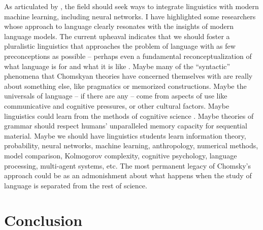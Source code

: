 \documentclass[output=paper,colorlinks,citecolor=brown
]{langscibook}
\begin{document}
As articulated by \citet{pater2019generative}, the field should seek ways to integrate linguistics with modern machine learning, including neural networks. I have highlighted some researchers whose approach to language clearly resonates with the insights of modern language models. The current upheaval indicates that we should foster a pluralistic linguistics that approaches the problem of language with as few preconceptions as possible -- perhaps even a fundamental reconceptualization of what language is for and what it is like \citep{edelman2019verbal}. Maybe many of the ``syntactic'' phenomena that Chomskyan theories have concerned themselves with are really about something else, like pragmatics or memorized constructions. Maybe the universals of language -- if there are any -- come from aspects of use like communicative and cognitive pressures, or other cultural factors. Maybe linguistics could learn from the methods of cognitive science \citep{edelman2007bridging}. Maybe theories of grammar should respect humans' unparalleled memory capacity for sequential material. Maybe we should have linguistics students learn information theory, probability, neural networks, machine learning, anthropology, numerical methods, model comparison, Kolmogorov complexity, cognitive psychology, language processing, multi-agent systems, etc. The most permanent legacy of Chomsky's approach could be as an admonishment about what happens when the study of language is separated from the rest of science. 
\section{Conclusion}
\end{document}
